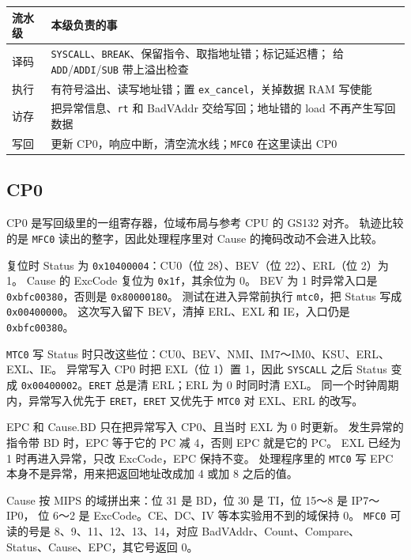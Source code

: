 \documentclass{article}
\begin{document}
\begin{center}
\begin{tabular}{lp{}}
\toprule
流水级 & 本级负责的事 \\
\midrule
译码 & \texttt{SYSCALL}、\texttt{BREAK}、保留指令、取指地址错；标记延迟槽；
       给 \texttt{ADD}/\texttt{ADDI}/\texttt{SUB} 带上溢出检查 \\
执行 & 有符号溢出、读写地址错；置 \texttt{ex\_cancel}，关掉数据 RAM 写使能 \\
访存 & 把异常信息、\texttt{rt} 和 BadVAddr 交给写回；地址错的 load 不再产生写回数据 \\
写回 & 更新 CP0，响应中断，清空流水线；\texttt{MFC0} 在这里读出 CP0 \\
\bottomrule
\end{tabular}
\end{center}

\subsection{CP0}
CP0 是写回级里的一组寄存器，位域布局与参考 CPU 的 GS132 对齐。
轨迹比较的是 \texttt{MFC0} 读出的整字，因此处理程序里对 Cause 的掩码改动不会进入比较。

复位时 Status 为 \texttt{0x10400004}：CU0（位 28）、BEV（位 22）、ERL（位 2）为 1。
Cause 的 ExcCode 复位为 \texttt{0x1f}，其余位为 0。
BEV 为 1 时异常入口是 \texttt{0xbfc00380}，否则是 \texttt{0x80000180}。
测试在进入异常前执行 \texttt{mtc0}，把 Status 写成 \texttt{0x00400000}。
这次写入留下 BEV，清掉 ERL、EXL 和 IE，入口仍是 \texttt{0xbfc00380}。

\texttt{MTC0} 写 Status 时只改这些位：CU0、BEV、NMI、IM7～IM0、KSU、ERL、EXL、IE。
异常写入 CP0 时把 EXL（位 1）置 1，因此 \texttt{SYSCALL} 之后 Status 变成
\texttt{0x00400002}。\texttt{ERET} 总是清 ERL；ERL 为 0 时同时清 EXL。
同一个时钟周期内，异常写入优先于 \texttt{ERET}，\texttt{ERET} 又优先于 \texttt{MTC0} 对 EXL、ERL 的改写。

EPC 和 Cause.BD 只在把异常写入 CP0、且当时 EXL 为 0 时更新。
发生异常的指令带 BD 时，EPC 等于它的 PC 减 4，否则 EPC 就是它的 PC。
EXL 已经为 1 时再进入异常，只改 ExcCode，EPC 保持不变。
处理程序里的 \texttt{MTC0} 写 EPC 本身不是异常，用来把返回地址改成加 4 或加 8 之后的值。

Cause 按 MIPS 的域拼出来：位 31 是 BD，位 30 是 TI，位 15～8 是 IP7～IP0，
位 6～2 是 ExcCode。CE、DC、IV 等本实验用不到的域保持 0。
\texttt{MFC0} 可读的号是 8、9、11、12、13、14，对应 BadVAddr、Count、Compare、
Status、Cause、EPC，其它号返回 0。
\end{document}
